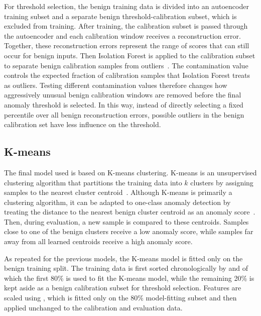 

For threshold selection, the benign training data is divided into an autoencoder training subset and a separate benign threshold-calibration subset, which is excluded from training. After training, the calibration subset is passed through the autoencoder and each calibration window receives a reconstruction error. Together, these reconstruction errors represent the range of scores that can still occur for benign inputs. Then Isolation Forest is applied to the calibration subset to separate benign calibration samples from outliers~\cite{catillo_cps-guard_2023}. The contamination value controls the expected fraction of calibration samples that Isolation Forest treats as outliers. Testing different contamination values therefore changes how aggressively unusual benign calibration windows are removed before the final anomaly threshold is selected. In this way, instead of directly selecting a fixed percentile over all benign reconstruction errors, possible outliers in the benign calibration set have less influence on the threshold.


\subsection{K-means}
The final model used is based on K-means clustering. K-means is an unsupervised clustering algorithm that partitions the training data into \(k\) clusters by assigning samples to the nearest cluster centroid~\cite{kanungo2000kmeans}. Although K-means is primarily a clustering algorithm, it can be adapted to one-class anomaly detection by treating the distance to the nearest benign cluster centroid as an anomaly score~\cite{meira_performance_2020}. Then, during evaluation, a new sample is compared to these centroids. Samples close to one of the benign clusters receive a low anomaly score, while samples far away from all learned centroids receive a high anomaly score.

As repeated for the previous models, the K-means model is fitted only on the benign training split. The training data is first sorted chronologically by  and  of which the first 80\%  is used to fit the K-means model, while the remaining 20\% is kept aside as a benign calibration subset for threshold selection. Features are scaled using , which is fitted only on the 80\% model-fitting subset and then applied unchanged to the calibration and evaluation data.

